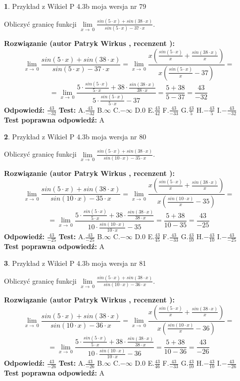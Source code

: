 \documentclass[12pt, a4paper]{article}
\theoremstyle{definition} %
\newtheorem{zad}{}
\newcommand{\zadStart}[1]{\begin{zad}#1\newline}
\newcommand{\zadStop}{\end{zad}}
\newcommand{\rozwStart}[2]{\noindent \textbf{Rozwiązanie (autor #1 , recenzent #2): }\newline}
\newcommand{\rozwStop}{\newline}
\newcommand{\odpStart}{\noindent \textbf{Odpowiedź:}\newline}
\newcommand{\odpStop}{\newline}
\newcommand{\testStart}{\noindent \textbf{Test:}\newline}
\newcommand{\testStop}{\newline}
\newcommand{\kluczStart}{\noindent \textbf{Test poprawna odpowiedź:}\newline}
\newcommand{\kluczStop}{\newline}
\begin{document}
\zadStart{Przykład z Wikieł P 4.3b moja wersja nr 79}


Obliczyć granicę funkcji $\lim\limits_{x\to\ 0}\frac{sin(5 \cdot x)+sin(38 \cdot x)}{sin(5 \cdot x)-37 \cdot x}$.
\zadStop
\rozwStart{Patryk Wirkus}{}
$$\lim\limits_{x\to\ 0}\frac{sin(5 \cdot x)+sin(38 \cdot x)}{sin(5 \cdot x)-37 \cdot x}=\lim\limits_{x\to\ 0}\frac{x(\frac{sin(5 \cdot x)}{x}+\frac{sin(38 \cdot x)}{x})}{x(\frac{sin(5 \cdot x)}{x}-37)}=$$
$$=\lim\limits_{x\to\ 0}\frac{5 \cdot \frac{sin(5 \cdot x)}{5 \cdot x}+38 \cdot \frac{sin(38 \cdot x)}{38 \cdot x}}{5 \cdot \frac{sin(5 \cdot x)}{5 \cdot x}-37}=\frac{5+38}{5-37} = \frac{43}{-32}$$
\rozwStop
\odpStart
$\frac{43}{-32}$
\odpStop
\testStart
A.$\frac{43}{-32}$
B.$\infty$
C.$-\infty$
D.$0$
E.$\frac{43}{42}$
F.$\frac{43}{-33}$
G.$\frac{43}{5}$
H.$-\frac{43}{5}$
I.$-\frac{43}{-32}$
\testStop
\kluczStart
A
\kluczStop



\zadStart{Przykład z Wikieł P 4.3b moja wersja nr 80}


Obliczyć granicę funkcji $\lim\limits_{x\to\ 0}\frac{sin(5 \cdot x)+sin(38 \cdot x)}{sin(10 \cdot x)-35 \cdot x}$.
\zadStop
\rozwStart{Patryk Wirkus}{}
$$\lim\limits_{x\to\ 0}\frac{sin(5 \cdot x)+sin(38 \cdot x)}{sin(10 \cdot x)-35 \cdot x}=\lim\limits_{x\to\ 0}\frac{x(\frac{sin(5 \cdot x)}{x}+\frac{sin(38 \cdot x)}{x})}{x(\frac{sin(10 \cdot x)}{x}-35)}=$$
$$=\lim\limits_{x\to\ 0}\frac{5 \cdot \frac{sin(5 \cdot x)}{5 \cdot x}+38 \cdot \frac{sin(38 \cdot x)}{38 \cdot x}}{10 \cdot \frac{sin(10 \cdot x)}{10 \cdot x}-35}=\frac{5+38}{10-35} = \frac{43}{-25}$$
\rozwStop
\odpStart
$\frac{43}{-25}$
\odpStop
\testStart
A.$\frac{43}{-25}$
B.$\infty$
C.$-\infty$
D.$0$
E.$\frac{43}{45}$
F.$\frac{43}{-33}$
G.$\frac{43}{10}$
H.$-\frac{43}{10}$
I.$-\frac{43}{-25}$
\testStop
\kluczStart
A
\kluczStop



\zadStart{Przykład z Wikieł P 4.3b moja wersja nr 81}


Obliczyć granicę funkcji $\lim\limits_{x\to\ 0}\frac{sin(5 \cdot x)+sin(38 \cdot x)}{sin(10 \cdot x)-36 \cdot x}$.
\zadStop
\rozwStart{Patryk Wirkus}{}
$$\lim\limits_{x\to\ 0}\frac{sin(5 \cdot x)+sin(38 \cdot x)}{sin(10 \cdot x)-36 \cdot x}=\lim\limits_{x\to\ 0}\frac{x(\frac{sin(5 \cdot x)}{x}+\frac{sin(38 \cdot x)}{x})}{x(\frac{sin(10 \cdot x)}{x}-36)}=$$
$$=\lim\limits_{x\to\ 0}\frac{5 \cdot \frac{sin(5 \cdot x)}{5 \cdot x}+38 \cdot \frac{sin(38 \cdot x)}{38 \cdot x}}{10 \cdot \frac{sin(10 \cdot x)}{10 \cdot x}-36}=\frac{5+38}{10-36} = \frac{43}{-26}$$
\rozwStop
\odpStart
$\frac{43}{-26}$
\odpStop
\testStart
A.$\frac{43}{-26}$
B.$\infty$
C.$-\infty$
D.$0$
E.$\frac{43}{46}$
F.$\frac{43}{-33}$
G.$\frac{43}{10}$
H.$-\frac{43}{10}$
I.$-\frac{43}{-26}$
\testStop
\kluczStart
A
\kluczStop
\end{document}
